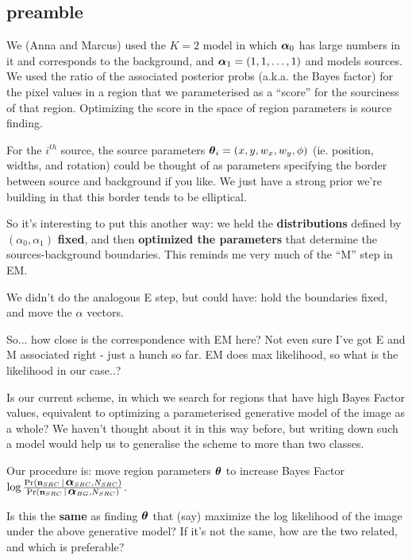\documentclass[12pt]{article}
\newcommand{\given}{\,|\,}
\renewcommand{\vec}[1]{\mathbf{#1}}
\newcommand{\balpha}{\mbox{\boldmath $\alpha$}}
\newcommand{\btheta}{\mbox{\boldmath $\theta$}}
\begin{document}
\subsection{preamble}

We (Anna and Marcus) used the $K=2$ model in which $\balpha_0$ has
large numbers in it and corresponds to the background, and $\balpha_1 =
(1,1,\ldots,1)$ and models sources. We used the ratio of the
associated posterior probs (a.k.a. the Bayes factor) for the pixel
values in a region that we parameterised as a ``score'' for the
sourciness of that region.  Optimizing the score in the space of
region parameters is source finding.

For the $i^{th}$ source, the source parameters $\btheta_i =
(x,y,w_x,w_y,\phi)$ (ie. position, widths, and rotation) could be
thought of as parameters specifying the border between source and
background if you like. We just have a strong prior we're building in
that this border tends to be elliptical.

So it's interesting to put this another way: we held the {\bf
  distributions} defined by $(\alpha_0,\alpha_1)$ {\bf fixed}, and
then {\bf optimized the parameters} that determine the
sources-background boundaries.  This reminds me very much of the ``M''
step in EM.

We didn't do the analogous E step, but could have: hold the
boundaries fixed, and move the $\alpha$ vectors.

So... how close is the correspondence with EM here? Not even sure I've
got E and M associated right - just a hunch so far. EM does max likelihood, so what is the likelihood in our case..?

Is our current scheme, in which we search for regions that have high
Bayes Factor values, equivalent to optimizing a parameterised
generative model of the image as a whole? We haven't thought about it
in this way before, but writing down such a model would help us to
generalise the scheme to more than two classes.

Our procedure is: move region parameters $\btheta$ to increase Bayes Factor $\log \frac{\Pr(\vec{n}_{SRC} \given \balpha_{SRC}, N_{SRC})}{\Pr(\vec{n}_{SRC} \given \balpha_{BG}, N_{SRC})}$.

Is this the {\bf same} as finding $\btheta$ that (say) maximize the log
likelihood of the image under the above generative model?
If it's not the same, how are the two related, and which is preferable?
\end{document}
